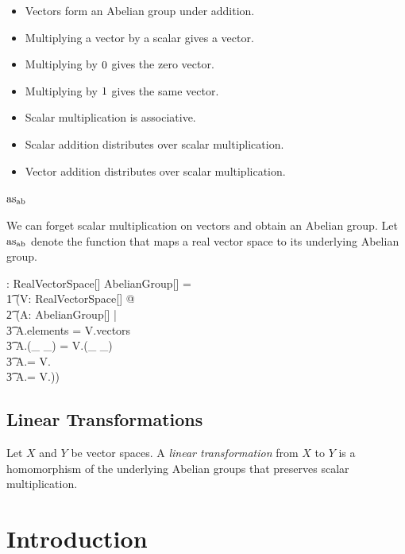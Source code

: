 \documentclass[11pt, oneside]{article}
\begin{document}
\begin{itemize}
	\item Vectors form an Abelian group under addition.
	\item Multiplying a vector by a scalar gives a vector.
	\item Multiplying by $0$ gives the zero vector.
	\item Multiplying by $1$ gives the same vector.
	\item Scalar multiplication is associative.
	\item Scalar addition distributes over scalar multiplication.
	\item Vector addition distributes over scalar multiplication.
\end{itemize}

\subsubsection{$\operatorname{as_{ab}}$}

We can forget scalar multiplication on vectors and obtain an Abelian group.
Let $\operatorname{as_{ab}}$ denote the function that maps a real vector space to
its underlying Abelian group.

\begin{gendef}[\genT]
	\RealVectorSpaceAbelianGroup: RealVectorSpace[\genT] \fun AbelianGroup[\genT]
	\where
	\RealVectorSpaceAbelianGroup = \\
	\t1	(\lambda V: RealVectorSpace[\genT] @ \\
	\t2		(\mu A: AbelianGroup[\genT] | \\
	\t3			A.elements = V.vectors \land \\
	\t3			A.(\_ \addG \_) = V.(\_ \addV \_) \land \\
	\t3			A.\zeroG = V.\zeroV \land \\
	\t3			A.\negG = V.\negV))
\end{gendef}

\subsection{Linear Transformations}

Let $X$ and $Y$ be vector spaces.
A {\em linear transformation} from $X$ to $Y$ is a homomorphism of the underlying Abelian groups
that preserves scalar multiplication.

\section{Introduction}
\end{document}
